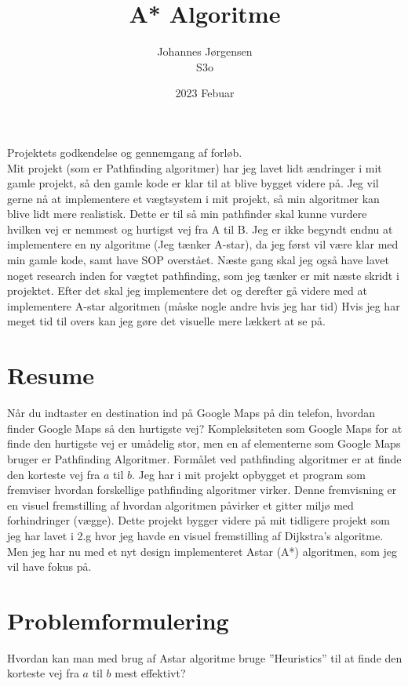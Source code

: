 \documentclass[12pt]{article}
\begin{document}
\title{A* Algoritme}
\author{Johannes Jørgensen\\ S3o}
\date{2023 Febuar}
\maketitle

Projektets godkendelse og gennemgang af forløb.\\
Mit projekt (som er Pathfinding algoritmer) har jeg lavet lidt ændringer i mit gamle projekt, så den gamle kode er klar til at blive bygget videre på. Jeg vil gerne nå at implementere et vægtsystem i mit projekt, så min algoritmer kan blive lidt mere realistisk. Dette er til så min pathfinder skal kunne vurdere hvilken vej er nemmest og hurtigst vej fra A til B. Jeg er ikke begyndt endnu at implementere en ny algoritme (Jeg tænker A-star), da jeg først vil være klar med min gamle kode, samt have SOP overstået.  
Næste gang skal jeg også have lavet noget research inden for vægtet pathfinding, som jeg tænker er mit næste skridt i projektet. 
Efter det skal jeg implementere det og derefter gå videre med at implementere A-star algoritmen (måske nogle andre hvis jeg har tid)
Hvis jeg har meget tid til overs kan jeg gøre det visuelle mere lækkert at se på. 

\pagebreak
\tableofcontents
\pagebreak

\section{Resume}
Når du indtaster en destination ind på Google Maps på din telefon, hvordan finder Google Maps så den hurtigste vej? Kompleksiteten som Google Maps for at finde den hurtigste vej er umådelig stor, men en af elementerne som Google Maps bruger er Pathfinding Algoritmer. Formålet ved pathfinding algoritmer er at finde den korteste vej fra $a$ til $b$.
Jeg har i mit projekt opbygget et program som fremviser hvordan forskellige pathfinding algoritmer virker. Denne fremvisning er en visuel fremstilling af hvordan algoritmen påvirker et gitter miljø med forhindringer (vægge). Dette projekt bygger videre på mit tidligere projekt som jeg har lavet i 2.g hvor jeg havde en visuel fremstilling af Dijkstra’s algoritme. Men jeg har nu med et nyt design implementeret Astar (A*) algoritmen, som jeg vil have fokus på.

\section{Problemformulering}
Hvordan kan man med brug af Astar algoritme bruge ”Heuristics” til at finde den korteste vej fra $a$ til $b$ mest effektivt?
\end{document}
